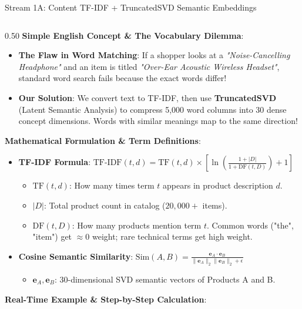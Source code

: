 \documentclass[10pt]{beamer}
\begin{document}
\begin{frame}[fragile]{Stream 1A: Content TF-IDF + TruncatedSVD Semantic Embeddings}
\begin{columns}[T]
    \begin{column}{0.50\textwidth}
        {\color{brandred}\textbf{Simple English Concept \& The Vocabulary Dilemma}}:
        \begin{itemize}\scriptsize
            \item \textbf{The Flaw in Word Matching}: If a shopper looks at a \textit{"Noise-Cancelling Headphone"} and an item is titled \textit{"Over-Ear Acoustic Wireless Headset"}, standard word search fails because the exact words differ!
            \item \textbf{Our Solution}: We convert text to TF-IDF, then use \textbf{TruncatedSVD} (Latent Semantic Analysis) to compress 5,000 word columns into 30 dense concept dimensions. Words with similar meanings map to the same direction!
        \end{itemize}
        {\color{brandorange}\textbf{Mathematical Formulation \& Term Definitions}}:
        \begin{itemize}\scriptsize
            \item \textbf{TF-IDF Formula}: $\text{TF-IDF}(t, d) = \text{TF}(t, d) \times \left[ \ln\left(\frac{1 + |D|}{1 + \text{DF}(t, D)}\right) + 1 \right]$
            \begin{itemize}\tiny
                \item $\text{TF}(t, d)$: How many times term $t$ appears in product description $d$.
                \item $|D|$: Total product count in catalog ($20,000+$ items).
                \item $\text{DF}(t, D)$: How many products mention term $t$. Common words ("the", "item") get $\approx 0$ weight; rare technical terms get high weight.
            \end{itemize}
            \item \textbf{Cosine Semantic Similarity}: $\text{Sim}(A, B) = \frac{\mathbf{e}_A \cdot \mathbf{e}_B}{\|\mathbf{e}_A\|_2 \|\mathbf{e}_B\|_2 + \epsilon}$
            \begin{itemize}\tiny
                \item $\mathbf{e}_A, \mathbf{e}_B$: 30-dimensional SVD semantic vectors of Products A and B.
            \end{itemize}
        \end{itemize}
        {\color{brandred}\textbf{Real-Time Example \& Step-by-Step Calculation}}:

\end{column}
\end{columns}
\end{frame}
\end{document}
